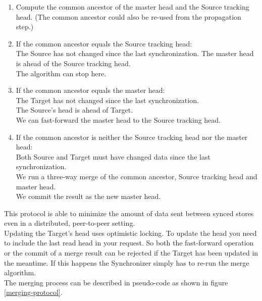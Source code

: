 \begin{enumerate}
\item Compute the common ancestor of the master head and the Source tracking head. (The common ancestor could also be re-used from the propagation step.)
\item If the common ancestor equals the Source tracking head:\\
  The Source has not changed since the last synchronization. The master head is ahead of the Source tracking head.\\
  The algorithm can stop here.
\item If the common ancestor equals the master head:\\
  The Target has not changed since the last synchronization.\\
  The Source's head is ahead of Target.\\
  We can fast-forward the master head to the Source tracking head.
\item If the common ancestor is neither the Source tracking head nor the master head:\\
  Both Source and Target must have changed data since the last synchronization.\\
  We run a three-way merge of the common ancestor, Source tracking head and master head.\\
  We commit the result as the new master head.
\end{enumerate}

This protocol is able to minimize the amount of data sent between synced
stores even in a distributed, peer-to-peer setting.\\

Updating the Target's head uses optimistic locking.
To update the head you need to include the last read head in your request.
So both the fast-forward operation or the commit of a merge result can be rejected if the Target has been updated in the meantime.
If this happens the Synchronizer simply has to re-run the merge algorithm.\\

The merging process can be described in pseudo-code as shown in figure \ref{merging-protocol}.

